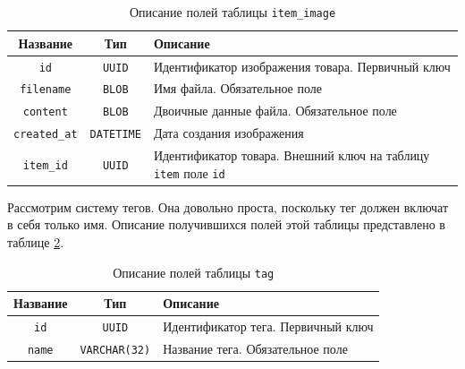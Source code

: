 \documentclass[a4paper,14pt]{extarticle}
\begin{document}
\begin{center}
    \begin{longtable}{|c|c|>{\centering\arraybackslash}m{10.5cm}|}
        \caption{Описание полей таблицы \texttt{item\_image}}
        \label{tab:item_image}
        \\
        \hline
        \textbf{Название}    & \textbf{Тип}      & \textbf{Описание}                                                            \\
        \hline
        \texttt{id}          & \texttt{UUID}     & Идентификатор изображения товара. Первичный ключ                             \\
        \hline
        \texttt{filename}    & \texttt{BLOB}     & Имя файла. Обязательное поле                                                 \\
        \hline
        \texttt{content}     & \texttt{BLOB}     & Двоичные данные файла. Обязательное поле                                     \\
        \hline
        \texttt{created\_at} & \texttt{DATETIME} & Дата создания изображения                                                    \\
        \hline
        \texttt{item\_id}    & \texttt{UUID}     & Идентификатор товара. Внешний ключ на таблицу \texttt{item} поле \texttt{id} \\
        \hline
    \end{longtable}
\end{center}

Рассмотрим систему тегов. Она довольно проста, поскольку тег должен включат в себя только имя. Описание получившихся полей этой таблицы представлено в таблице \ref{tab:tag}.

\begin{center}
    \begin{longtable}{|c|c|>{\centering\arraybackslash}m{10cm}|}
        \caption{Описание полей таблицы \texttt{tag}}
        \label{tab:tag}
        \\
        \hline
        \textbf{Название} & \textbf{Тип}         & \textbf{Описание}                  \\
        \hline
        \texttt{id}       & \texttt{UUID}        & Идентификатор тега. Первичный ключ \\
        \hline
        \texttt{name}     & \texttt{VARCHAR(32)} & Название тега. Обязательное поле   \\
        \hline
    \end{longtable}
\end{center}
\end{document}
